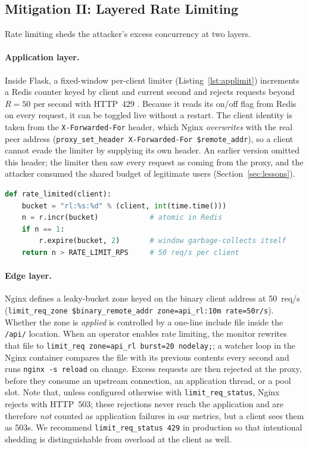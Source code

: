 \documentclass[preprint,12pt]{elsarticle}
\begin{document}
\subsection{Mitigation II: Layered Rate Limiting}
\label{sec:design-rl}
Rate limiting sheds the attacker's excess concurrency at two layers.

\paragraph{Application layer.} Inside Flask, a fixed-window per-client limiter
(Listing~\ref{lst:applimit}) increments a Redis counter keyed by client and current
second and rejects requests beyond $R=50$ per second with HTTP~429
\cite{rfc6585}. Because it reads its on/off flag from Redis on every request, it can be
toggled live without a restart. The client identity is taken from the
\texttt{X-Forwarded-For} header, which Nginx \emph{overwrites} with the real peer
address (\texttt{proxy\_set\_header X-Forwarded-For \$remote\_addr}), so a client cannot
evade the limiter by supplying its own header. An earlier version omitted this header;
the limiter then saw every request as coming from the proxy, and the attacker consumed
the shared budget of legitimate users (Section~\ref{sec:lessons}).

\begin{lstlisting}[language=Python, caption={Application-layer fixed-window limiter (\texttt{backend/app.py}).}, label={lst:applimit}]
def rate_limited(client):
    bucket = "rl:%s:%d" % (client, int(time.time()))
    n = r.incr(bucket)            # atomic in Redis
    if n == 1:
        r.expire(bucket, 2)       # window garbage-collects itself
    return n > RATE_LIMIT_RPS     # 50 req/s per client
\end{lstlisting}

\paragraph{Edge layer.} Nginx defines a leaky-bucket zone keyed on the binary client
address at 50~req/s (\texttt{limit\_req\_zone \$binary\_remote\_addr zone=api\_rl:10m
rate=50r/s}). Whether the zone is \emph{applied} is controlled by a one-line include
file inside the \texttt{/api/} location. When an operator enables rate limiting, the
monitor rewrites that file to \texttt{limit\_req zone=api\_rl burst=20 nodelay;}; a
watcher loop in the Nginx container compares the file with its previous contents every
second and runs \texttt{nginx -s reload} on change. Excess requests are then rejected
at the proxy, before they consume an upstream connection, an application thread, or a
pool slot. Note that, unless configured otherwise with \texttt{limit\_req\_status},
Nginx rejects with HTTP~503; these rejections never reach the application and are
therefore \emph{not} counted as application failures in our metrics, but a client sees
them as 503s. We recommend \texttt{limit\_req\_status 429} in production so that
intentional shedding is distinguishable from overload at the client as well.
\end{document}

